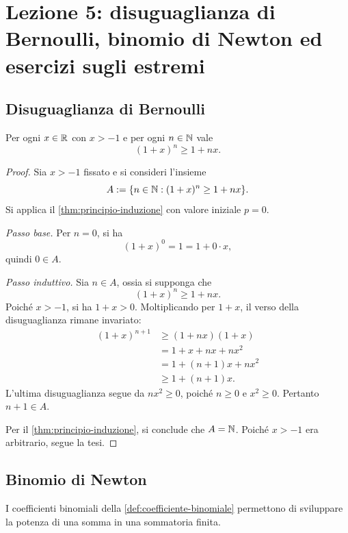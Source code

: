\chapter[Lezione 5 --- 6 ottobre 2026]{Lezione 5: disuguaglianza di Bernoulli, binomio di Newton ed esercizi sugli estremi}
\label{chap:lezione-05}

\section{Disuguaglianza di Bernoulli}
\label{sec:lez05-bernoulli}

\begin{theorem}
\label{thm:disuguaglianza-bernoulli}
Per ogni \(x\in\mathbb{R}\) con \(x>-1\) e per ogni \(n\in\mathbb{N}\) vale
\[
  (1+x)^n\ge 1+nx.
\]
\end{theorem}

\begin{proof}
Sia \(x>-1\) fissato e si consideri l'insieme
\[
  A:=\{n\in\mathbb{N}:(1+x)^n\ge 1+nx\}.
\]
Si applica il \cref{thm:principio-induzione} con valore iniziale
\(p=0\).

\emph{Passo base.}
Per \(n=0\), si ha
\[
  (1+x)^0=1=1+0\cdot x,
\]
quindi \(0\in A\).

\emph{Passo induttivo.}
Sia \(n\in A\), ossia si supponga che
\[
  (1+x)^n\ge 1+nx.
\]
Poiché \(x>-1\), si ha \(1+x>0\). Moltiplicando per
\(1+x\), il verso della disuguaglianza rimane invariato:
\begin{align*}
  (1+x)^{n+1}
    &\ge (1+nx)(1+x)\\
    &=1+x+nx+nx^2\\
    &=1+(n+1)x+nx^2\\
    &\ge 1+(n+1)x.
\end{align*}
L'ultima disuguaglianza segue da \(nx^2\ge0\), poiché
\(n\ge0\) e \(x^2\ge0\). Pertanto \(n+1\in A\).

Per il \cref{thm:principio-induzione}, si conclude che
\(A=\mathbb{N}\). Poiché \(x>-1\) era arbitrario, segue la tesi.
\end{proof}

\section{Binomio di Newton}
\label{sec:lez05-binomio-newton}

I coefficienti binomiali della
\cref{def:coefficiente-binomiale} permettono di sviluppare la potenza
di una somma in una sommatoria finita.

